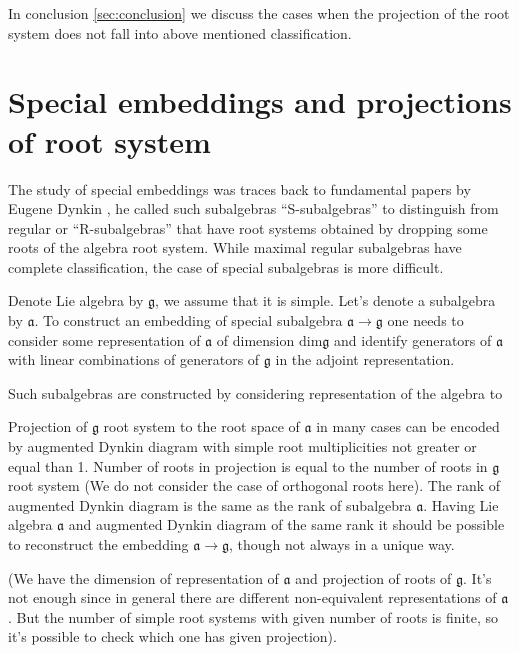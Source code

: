 \documentclass{article}
\begin{document}
In conclusion \ref{sec:conclusion} we discuss the cases when the projection of the root system does
not fall into above mentioned classification.



\section{Special embeddings and projections of root system}
\label{sec:spec-embedd-proj}

The study of special embeddings was traces back to fundamental papers by Eugene Dynkin
\cite{dynkin1952semisimple,dynkin1952maximal}, he called such subalgebras ``S-subalgebras'' to
distinguish from regular or ``R-subalgebras'' that have root systems obtained by dropping some roots
of the algebra root system. While maximal regular subalgebras have complete classification, the case
of special subalgebras is more difficult.

Denote Lie algebra by $\mathfrak{g}$, we assume that it is simple. Let's denote a subalgebra by
$\mathfrak{a}$. To construct an embedding of special subalgebra $\mathfrak{a}\to \mathfrak{g}$ one
needs to consider some representation of $\mathfrak{a}$ of dimension $\mathrm{dim}\mathfrak{g}$ and
identify generators of $\mathfrak{a}$ with linear combinations of generators of $\mathfrak{g}$ in
the adjoint representation. 

 Such subalgebras are constructed by considering
representation of the algebra to

Projection of $\mathfrak{g}$ root system to the root space of $\mathfrak{a}$ in many cases can be
encoded by augmented Dynkin diagram with simple root multiplicities not greater or equal than 1.
Number of roots in projection is equal to the number of roots in $\mathfrak{g}$ root system (We do
not consider the case of orthogonal roots here). The rank of augmented Dynkin diagram is the same as
the rank of subalgebra $\mathfrak{a}$. Having Lie algebra $\mathfrak{a}$ and augmented Dynkin
diagram of the same rank it should be possible to reconstruct the embedding $\mathfrak{a}\to
\mathfrak{g}$, though not always in a unique way. 

(We have the dimension of representation of $\mathfrak{a}$ and projection of roots of
$\mathfrak{g}$. It's not enough since in general there are different non-equivalent representations
of $\mathfrak{a}$. But the number of simple root systems with given number of roots is finite, so
it's possible to check which one has given projection).
\end{document}
